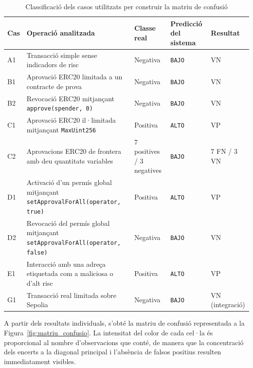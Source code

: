 \begin{table}[htbp]
\centering
\small
\renewcommand{\arraystretch}{1.2}
\begin{tabularx}{\textwidth}{
    p{}
    X
    p{}
    p{}
    p{}
}
\hline
\textbf{Cas} &
\textbf{Operació analitzada} &
\textbf{Classe real} &
\textbf{Predicció del sistema} &
\textbf{Resultat} \\
\hline

A1 &
Transacció simple sense indicadors de risc &
Negativa &
\texttt{BAJO} &
VN \\

B1 &
Aprovació ERC20 limitada a un contracte de prova &
Negativa &
\texttt{BAJO} &
VN \\

B2 &
Revocació ERC20 mitjançant \texttt{approve(spender, 0)} &
Negativa &
\texttt{BAJO} &
VN \\

C1 &
Aprovació ERC20 il·limitada mitjançant \texttt{MaxUint256} &
Positiva &
\texttt{ALTO} &
VP \\

C2 &
Aprovacions ERC20 de frontera amb deu quantitats variables &
7 positives / 3 negatives &
\texttt{BAJO} &
7 FN / 3 VN \\

D1 &
Activació d’un permís global mitjançant \texttt{setApprovalForAll}\allowbreak\texttt{(operator, true)} &
Positiva &
\texttt{ALTO} &
VP \\

D2 &
Revocació del permís global mitjançant \texttt{setApprovalForAll}\allowbreak\texttt{(operator, false)} &
Negativa &
\texttt{BAJO} &
VN \\

E1 &
Interacció amb una adreça etiquetada com a maliciosa o d’alt risc &
Positiva &
\texttt{ALTO} &
VP \\

G1 &
Transacció real limitada sobre Sepolia &
Negativa &
\texttt{BAJO} &
VN (integració) \\

\hline
\end{tabularx}
\caption{Classificació dels casos utilitzats per construir la matriu de confusió}
\label{tab:casos_matriu_confusio}
\end{table}

A partir dels resultats individuals, s’obté la matriu de confusió representada a la Figura~\ref{fig:matriu_confusio}. La intensitat del color de cada cel·la és proporcional al nombre d’observacions que conté, de manera que la concentració dels encerts a la diagonal principal i l’absència de falsos positius resulten immediatament visibles.


